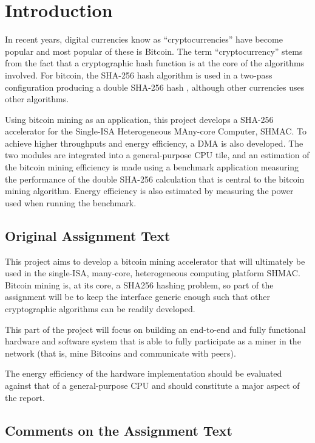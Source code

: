 \chapter{Introduction}

In recent years, digital currencies know as ``cryptocurrencies'' have become popular
and most popular of these is Bitcoin. The term ``cryptocurrency'' stems from the fact
that a cryptographic hash function is at the core of the algorithms involved. For bitcoin,
the SHA-256 hash algorithm is used in a two-pass configuration producing a double SHA-256
hash \cite{bitcoin}, although other currencies uses other algorithms.

Using bitcoin mining as an application, this project develops a SHA-256 accelerator
for the Single-ISA Heterogeneous MAny-core Computer, SHMAC. To achieve higher throughputs
and energy efficiency, a DMA is also developed. The two modules are integrated into a
general-purpose CPU tile, and an estimation of the bitcoin mining efficiency is made
using a benchmark application measuring the performance of the double SHA-256 calculation
that is central to the bitcoin mining algorithm. Energy efficiency is also estimated by
measuring the power used when running the benchmark.

\section{Original Assignment Text}

This project aims to develop a bitcoin mining accelerator that will ultimately be
used in the single-ISA, many-core, heterogeneous computing platform SHMAC. Bitcoin
mining is, at its core, a SHA256 hashing problem, so part of the assignment will
be to keep the interface generic enough such that other cryptographic algorithms
can be readily developed.

This part of the project will focus on building an end-to-end and fully functional
hardware and software system that is able to fully participate as a miner in the
network (that is, mine Bitcoins and communicate with peers).

The energy efficiency of the hardware implementation should be evaluated against that
of a general-purpose CPU and should constitute a major aspect of the report.

\section{Comments on the Assignment Text}

